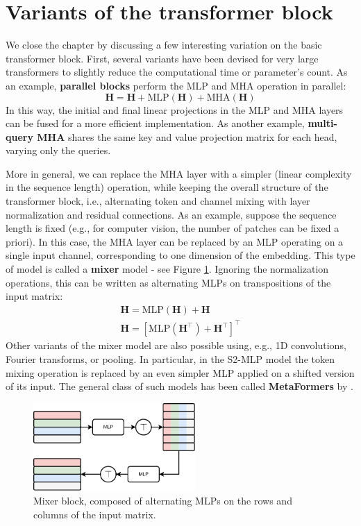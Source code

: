 \section{Variants of the transformer block}
\label{subsec:mha_variants}

We close the chapter by discussing a few interesting variation on the basic transformer block. First, several variants have been devised for very large transformers to slightly reduce the computational time or parameter’s count. As an example, \textbf{parallel blocks} \cite{dehghani2023scaling} perform the MLP and MHA operation in parallel:
%
$$
\mathbf{H} = \mathbf{H}+\text{MLP}(\mathbf{H})+\text{MHA}(\mathbf{H})
$$
%
In this way, the initial and final linear projections in the MLP and MHA layers can be fused for a more efficient implementation. As another example, \textbf{multi-query MHA} \cite{shazeer2019fast} shares the same key and value projection matrix for each head, varying only the queries.

More in general, we can replace the MHA layer with a simpler (linear complexity in the sequence length) operation, while keeping the overall structure of the transformer block, i.e., alternating token and channel mixing with layer normalization and residual connections. As an example, suppose the sequence length is fixed (e.g., for computer vision, the number of patches can be fixed a priori). In this case, the MHA layer can be replaced by an MLP operating on a single input channel, corresponding to one dimension of the embedding. This type of model is called a \textbf{mixer} model \cite{tolstikhin2021mlp} - see Figure \ref{fig:mlp_mixer}.
Ignoring the normalization operations, this can be written as alternating MLPs on transpositions of the input matrix:
%
\begin{gather}
\mathbf{H}=\text{MLP}(\mathbf{H})+\mathbf{H} \\ \mathbf{H}= \left[\text{MLP}(\mathbf{H}^\top)+\mathbf{H}^\top\right]^\top
\end{gather}
%
Other variants of the mixer model are also possible using, e.g., 1D convolutions, Fourier transforms, or pooling. In particular, in the S2-MLP \cite{yu2022s2}  model the token mixing operation is replaced by an even simpler MLP applied on a shifted version of its input. The general class of such models has been called \textbf{MetaFormers} by \cite{yu2022metaformer}.

\begin{figure}
    \centering
    \hspace{1em}\includegraphics[width=0.55\textwidth]{images/mixer}
    \caption{Mixer block, composed of alternating MLPs on the rows and columns of the input matrix.}
    \label{fig:mlp_mixer}
\end{figure}

